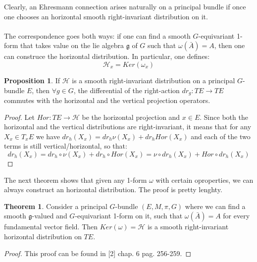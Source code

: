\documentclass[12pt,a4paper]{report}
\theoremstyle{definition}
\theoremstyle{Theorem}
\newtheorem{Theo}[Def]{Theorem}
\newtheorem{Prop}[Def]{Proposition}
\theoremstyle{definition}
\theoremstyle{definition}
\begin{document}
		Clearly, an Ehresmann connection arises naturally on a principal bundle if once one chooses an horizontal smooth right-invariant distribution on it.\\
		\\
		The correspondence goes both ways: if one can find a smooth $G$-equivariant 1-form that takes value on the lie algebra $\mathfrak{g}$ of $G$ such that $\omega(\bar{A})=A$, then one can construce the horizontal distribution. In particular, one defines: $$\mathcal{H}_{x}=Ker(\omega_{x})$$
		\begin{Prop}
			If $\mathcal{H}$ is a smooth right-invariant distribution on a principal $G$-bundle $E$, then $\forall g\in G$, the differential of the right-action $dr_g:TE\rightarrow TE$ commutes with the horizontal and the vertical projection operators.
		\end{Prop}
		\begin{proof}
			Let $Hor:TE\rightarrow\mathcal{H}$ be the horizontal projection and $x\in E$. Since both the horizontal and the vertical distributions are right-invariant, it means that for any $X_{x}\in T_xE$ we have $dr_h( X_{x})=dr_h \nu(X_{x})+dr_hHor(X_{x})$ and each of the two terms is still vertical/horizontal, so that:
			$$dr_h (X_{x})=dr_h\circ \nu(X_{x})+dr_h\circ Hor(X_{x})=
			\nu\circ dr_h(X_{x})+Hor\circ dr_h(X_{x})$$
		\end{proof}
		The next theorem shows that given any 1-form $\omega$ with certain oproperties, we can always construct an horizontal distribution. The proof is pretty lenghty.
		\begin{Theo}
			Consider a principal $G$-bundle $(E,M,\pi,G)$ where we can find a smooth $\mathfrak{g}$-valued and $G$-equivariant 1-form on it, such that $\omega(\bar{A})=A$ for every fundamental vector field. Then $Ker(\omega)=\mathcal{H}$ is a smooth right-invariant horizontal distribution on $TE$.
		\end{Theo}
		\begin{proof}
			This proof can be found in [2] chap. 6 pag. 256-259.
		\end{proof}
\end{document}
